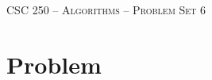 \documentclass[11pt]{article}
\theoremstyle{nonumberplain}
\begin{document}



\begin{center}

{\LARGE
\textsc{CSC 250 -- Algorithms -- Problem Set 6}
\bigskip}

\bigskip

\end{center}

\section*{Problem}




\end{document}
